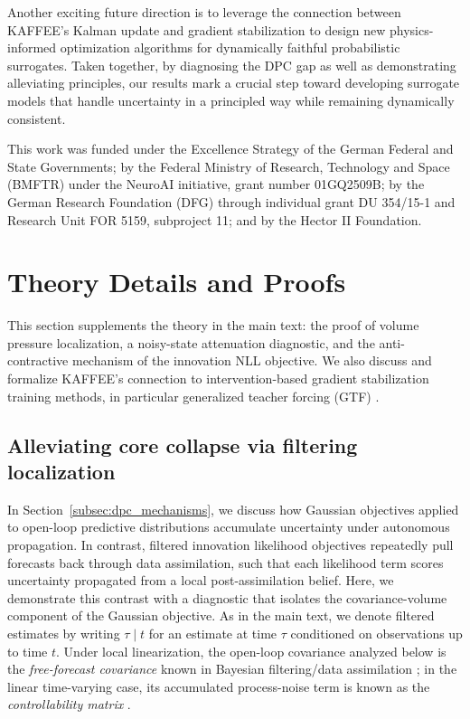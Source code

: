 \documentclass{article}
\theoremstyle{plain}
\theoremstyle{definition}
\theoremstyle{remark}
\begin{document}
Another exciting future direction is to leverage the connection between KAFFEE's Kalman update and gradient stabilization to design new physics-informed optimization algorithms for dynamically faithful probabilistic surrogates. Taken together, by diagnosing the DPC gap as well as demonstrating alleviating principles, our results mark a crucial step toward developing surrogate models that handle uncertainty in a principled way while remaining dynamically consistent.
\begin{ack}
This work was funded under the Excellence Strategy of the German Federal and State Governments; by the Federal Ministry of Research, Technology and Space (BMFTR) under the NeuroAI initiative, grant number 01GQ2509B; by the German Research Foundation (DFG) through individual grant DU 354/15-1 and Research Unit FOR 5159, subproject 11; and by the Hector II Foundation.
\end{ack}

{\small


}

\clearpage
\appendix

\section{Theory Details and Proofs}
\label{app:theory}

This section supplements the theory in the main text: the proof of volume pressure localization, a noisy-state attenuation
diagnostic, and the anti-contractive mechanism of the innovation NLL objective. We also discuss and formalize KAFFEE's connection to intervention-based gradient stabilization training methods, in particular generalized teacher forcing (GTF) \citep{hess2023generalized}.

\subsection{Alleviating core collapse via filtering localization}
\label{app:volume_pressure_proof}
In Section~\ref{subsec:dpc_mechanisms}, we discuss how Gaussian objectives applied to open-loop predictive distributions accumulate uncertainty under autonomous propagation.
In contrast, filtered innovation likelihood objectives repeatedly pull forecasts back through data assimilation, such that each likelihood term scores uncertainty propagated from a local post-assimilation belief. Here, we demonstrate this contrast with a diagnostic that isolates the covariance-volume component of the Gaussian objective. As in the main text, we denote filtered estimates by writing $\tau \mid t$ for an estimate at time $\tau$ conditioned on observations up to time $t$. Under local linearization, the open-loop covariance analyzed below is the \emph{free-forecast covariance} known in Bayesian filtering/data assimilation \citep{carrassi2022data}; in the linear time-varying case, its accumulated process-noise term is known as the \emph{controllability matrix} \citep{jazwinski1970stochastic}.
\end{document}
